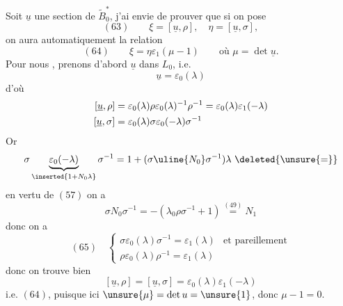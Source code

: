 Soit $\underline u$ une section de $\widetilde B_0^*$, j'ai envie de prouver que si on pose
\[
(63)\qquad \xi=[\underline u,\rho],\quad\eta=[\underline u,\sigma],
\]
on aura automatiquement la relation
\[
(64)\qquad\xi=\eta\varepsilon_1(\mu-1)\qquad\text{où }\mu=\det\underline u.
\]
Pour nous , prenons d'abord $\underline u$ dans $L_0$, i.e.
\[
\underline u=\varepsilon_0(\lambda)
\]
d'où
\[
\begin{aligned}
\relax
[\underline u,\rho]&=\varepsilon_0(\lambda)\rho\varepsilon_0(\lambda)^{-1}\rho^{-1}
=\varepsilon_0(\lambda)\varepsilon_1(-\lambda)\\
[\underline u,\sigma]&=\varepsilon_0(\lambda)\sigma\varepsilon_0(-\lambda)\sigma^{-1}
\end{aligned}
\]
Or
\[
\sigma\underbrace{\varepsilon_0(-\lambda)}_{\inserted{1+N_0\lambda}}\sigma^{-1}
=1+(\sigma\uline{N_0}\sigma^{-1})\lambda\ \deleted{\unsure{=}}
\]
  en vertu de $(57)$ on a
\[
\sigma N_0\sigma^{-1}=-(\lambda_0\rho\sigma^{-1}+1)\overset{(49)}{=}N_1
\]
donc on a
\[
(65)\quad\left\{\begin{array}{ll}
\sigma\varepsilon_0(\lambda)\sigma^{-1}=\varepsilon_1(\lambda)&\text{et pareillement}\\
\rho\varepsilon_0(\lambda)\rho^{-1}=\varepsilon_1(\lambda)
\end{array}\right.
\]
donc on trouve bien
\[
[\underline u,\rho]=[\underline u,\sigma]=\varepsilon_0(\lambda)\varepsilon_1(-\lambda)
\]
i.e. $(64)$, puisque ici $\unsure{\mu}=\det u=\unsure{1}$, donc $\mu-1=0$.



